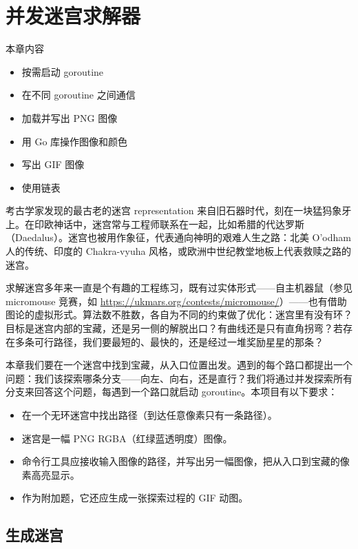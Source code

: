 \chapter{并发迷宫求解器}

\begin{infobox}{本章内容}
\begin{itemize}
  \item 按需启动 goroutine
  \item 在不同 goroutine 之间通信
  \item 加载并写出 PNG 图像
  \item 用 Go 库操作图像和颜色
  \item 写出 GIF 图像
  \item 使用链表
\end{itemize}
\end{infobox}

考古学家发现的最古老的迷宫 representation 来自旧石器时代，刻在一块猛犸象牙上。在印欧神话中，迷宫常与工程师联系在一起，比如希腊的代达罗斯（Daedalus）。迷宫也被用作象征，代表通向神明的艰难人生之路：北美 O'odham 人的传统、印度的 Chakra-vyuha 风格，或欧洲中世纪教堂地板上代表救赎之路的迷宫。

求解迷宫多年来一直是个有趣的工程练习，既有过实体形式——自主机器鼠（参见 micromouse 竞赛，如 \url{https://ukmars.org/contests/micromouse/}）——也有借助图论的虚拟形式。算法数不胜数，各自为不同的约束做了优化：迷宫里有没有环？目标是迷宫内部的宝藏，还是另一侧的解脱出口？有曲线还是只有直角拐弯？若存在多条可行路径，我们要最短的、最快的，还是经过一堆奖励星星的那条？

本章我们要在一个迷宫中找到宝藏，从入口位置出发。遇到的每个路口都提出一个问题：我们该探索哪条分支——向左、向右，还是直行？我们将通过并发探索所有分支来回答这个问题，每遇到一个路口就启动 goroutine。本项目有以下要求：

\begin{itemize}
  \item 在一个无环迷宫中找出路径（到达任意像素只有一条路径）。
  \item 迷宫是一幅 PNG RGBA（红绿蓝透明度）图像。
  \item 命令行工具应接收输入图像的路径，并写出另一幅图像，把从入口到宝藏的像素高亮显示。
  \item 作为附加题，它还应生成一张探索过程的 GIF 动图。
\end{itemize}

\section{生成迷宫}

